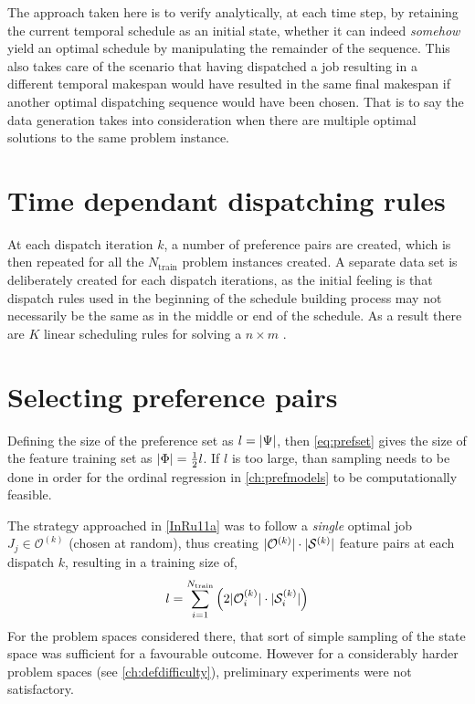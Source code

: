 The approach taken here is to verify analytically, at each time step, by retaining the current temporal schedule as an initial state, whether it can indeed \emph{somehow} yield an optimal schedule by manipulating the remainder of the sequence. 
This also takes care of the scenario that having dispatched a job resulting in a different temporal makespan would have resulted in the same final makespan if another optimal dispatching sequence would have been chosen. 
That is to say the data generation takes into consideration when there are multiple optimal solutions to the same problem instance. 

\section{Time dependant dispatching rules}
At each dispatch iteration $k$, a number of preference pairs are created, which is then repeated for all the $N_{\text{train}}$ problem instances created. 
A separate data set is deliberately created for each dispatch iterations, as 
the initial feeling is that dispatch rules used in the beginning of the 
schedule building process may not necessarily be the same as in the middle or 
end of the schedule. As a result there are $K$ linear scheduling rules for 
solving a $n \times m$ \jsp. 



\section{Selecting preference pairs}\label{sec:trdat:param}
Defining the size of the preference set as $l=\lvert\Psi\rvert$, then 
\cref{eq:prefset} 
gives the size of the feature training set as $\lvert\Phi\rvert=\frac{1}{2}l$.
If $l$ is too large, than sampling needs to be done in order for the ordinal 
regression in \cref{ch:prefmodels} to be computationally feasible.

The strategy approached in  \cref{InRu11a} was to follow a \emph{single} 
optimal job $J_j\in\mathcal{O}^{(k)}$ (chosen at random), thus creating 
$\lvert\mathcal{O}^{(k)}\rvert\cdot\lvert\mathcal{S}^{(k)}\rvert$ feature pairs at each 
dispatch $k$, resulting in a training size of,
\begin{equation}\label{eq:sizeS_b}
l =  \sum_{i=1}^{N_{\text{train}}} \left(2 \abs{\mathcal{O}^{(k)}_i}\cdot 
\abs{\mathcal{S}^{(k)}_i} \right)
\end{equation}
For the problem spaces considered there, that sort of simple sampling of the 
state space was sufficient for a favourable outcome. However for a considerably 
harder problem spaces (see \cref{ch:defdifficulty}), preliminary experiments 
were not satisfactory. 

